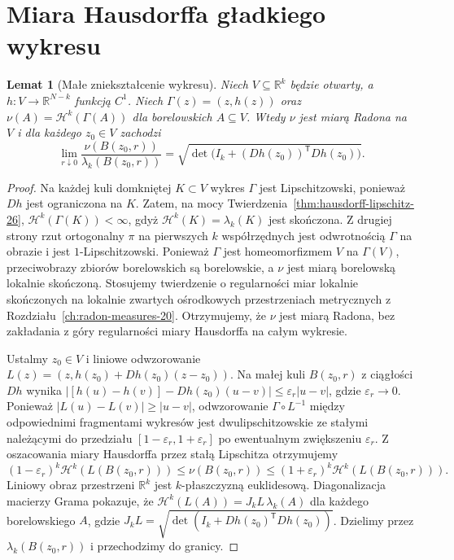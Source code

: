 \documentclass[11pt,a4paper,oneside]{book}
\numberwithin{equation}{chapter}
\theoremstyle{plain}
\newtheorem{lemat}[twierdzenie]{Lemat}
\theoremstyle{definition}
\theoremstyle{remark}
\begin{document}
\section{Miara Hausdorffa gładkiego wykresu}
\begin{lemat}[Małe zniekształcenie wykresu]
\label{lem:graph-hausdorff-28}
Niech $V\subseteq\mathbb R^k$ będzie otwarty,
a $h:V\to\mathbb R^{N-k}$ funkcją $C^1$.
Niech $\Gamma(z)=(z,h(z))$ oraz
$\nu(A)=\mathcal H^k(\Gamma(A))$
dla borelowskich $A\subseteq V$. Wtedy $\nu$
jest miarą Radona na $V$ i dla każdego
$z_0\in V$ zachodzi
\[
 \lim_{r\downarrow0}
 \frac{\nu(B(z_0,r))}{\lambda_k(B(z_0,r))}
 =\sqrt{\det\bigl(I_k+(Dh(z_0))^{\mathsf T}Dh(z_0)\bigr)}.
\]
\end{lemat}
\begin{proof}
Na każdej kuli domkniętej $K\subset V$ wykres $\Gamma$
jest Lipschitzowski, ponieważ $Dh$ jest ograniczona
na $K$. Zatem, na mocy
Twierdzenia~\ref{thm:hausdorff-lipschitz-26},
$\mathcal H^k(\Gamma(K))<\infty$, gdyż
$\mathcal H^k(K)=\lambda_k(K)$ jest skończona.
Z drugiej strony rzut ortogonalny $\pi$ na
pierwszych $k$ współrzędnych jest odwrotnością
$\Gamma$ na obrazie i jest $1$-Lipschitzowski.
Ponieważ $\Gamma$ jest homeomorfizmem $V$ na
$\Gamma(V)$, przeciwobrazy zbiorów borelowskich
są borelowskie, a $\nu$ jest miarą borelowską
lokalnie skończoną. Stosujemy twierdzenie o
regularności miar lokalnie skończonych na lokalnie
zwartych ośrodkowych przestrzeniach metrycznych
z Rozdziału~\ref{ch:radon-measures-20}.
Otrzymujemy, że $\nu$ jest miarą Radona,
bez zakładania z góry regularności miary
Hausdorffa na całym wykresie.

Ustalmy $z_0\in V$ i liniowe odwzorowanie
$L(z)=(z,h(z_0)+Dh(z_0)(z-z_0))$.
Na małej kuli $B(z_0,r)$ z ciągłości $Dh$ wynika
$|[h(u)-h(v)]-Dh(z_0)(u-v)|\le\varepsilon_r|u-v|$,
gdzie $\varepsilon_r\to0$.
Ponieważ $|L(u)-L(v)|\ge|u-v|$,
odwzorowanie $\Gamma\circ L^{-1}$ między
odpowiednimi fragmentami wykresów jest
dwulipschitzowskie ze stałymi należącymi
do przedziału $[1-\varepsilon_r,1+\varepsilon_r]$
po ewentualnym zwiększeniu $\varepsilon_r$.
Z oszacowania miary Hausdorffa przez stałą
Lipschitza otrzymujemy
\[
 (1-\varepsilon_r)^k\mathcal H^k(L(B(z_0,r)))
 \le\nu(B(z_0,r))\le
 (1+\varepsilon_r)^k\mathcal H^k(L(B(z_0,r))).
\]
Liniowy obraz przestrzeni $\mathbb R^k$ jest
$k$-płaszczyzną euklidesową. Diagonalizacja
macierzy Grama pokazuje, że
$\mathcal H^k(L(A))=J_kL\,\lambda_k(A)$
dla każdego borelowskiego $A$, gdzie
$J_kL=\sqrt{\det(I_k+Dh(z_0)^{\mathsf T}Dh(z_0))}$.
Dzielimy przez $\lambda_k(B(z_0,r))$ i
przechodzimy do granicy.
\end{proof}
\end{document}
